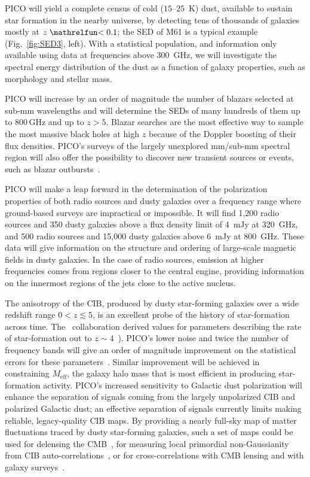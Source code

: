 \documentclass[PICOReport.tex]{subfiles}
\begin{document}
PICO will yield a complete census of cold ($15$--$25$~K) dust, available to sustain star formation in the nearby universe, by detecting tens of thousands of galaxies mostly at $z\simlt 0.1$; the \ac{SED} of M61 is a typical example (Fig.~\ref{fig:SED3}, left). With a statistical population, and information only available using data at frequencies above 300~GHz, we will investigate the spectral energy distribution of the dust as a function of galaxy properties, such as morphology and stellar mass. 

PICO will increase by an order of magnitude the number of blazars selected at sub-mm wavelengths and will determine the SEDs of many hundreds of them up to 800\,GHz and up to $z> 5$. Blazar searches are the most effective way to sample the most massive black holes at high $z$ because of the Doppler boosting of their flux densities. PICO's surveys of the largely unexplored mm/sub-mm spectral region will also offer the possibility to discover new transient sources or events, such as blazar outbursts~\cite{Metzger2015}.

PICO will make a leap forward in the determination of the polarization properties of both radio sources and dusty galaxies over a frequency range where ground-based surveys are impractical or impossible.
It will find  1,200 radio sources and 350 dusty galaxies above a flux density limit of 4~mJy at 320~GHz, and 500 radio sources and 15,000 dusty galaxies above 6~mJy at 800~GHz.
These data will give information on the structure and ordering of large-scale magnetic fields in  dusty galaxies. In the case of radio sources, emission at higher frequencies comes from regions closer to the central engine, providing information on the innermost regions of the jets close to the active nucleus. 

The anisotropy of the \ac{CIB}, produced by dusty star-forming galaxies over a wide redshift range $0 < z \lesssim 5$, is an excellent probe of the history of star-formation across time. The \planck\ collaboration derived values for parameters describing the rate of star-formation out to $z\sim4$~\cite{2014A&A...571A..30P,2014A&A...571A..18P,madau2014}). PICO's lower noise and twice the number of frequency bands will give an order of magnitude improvement on the statistical errors for these parameters~\cite{Wu:2016hej}. Similar improvement will be achieved in constraining $M_{\mathrm{eff}}$, the galaxy halo mass that is most efficient in producing star-formation activity. PICO's increased sensitivity to Galactic dust polarization will enhance the separation of signals coming from the largely unpolarized \ac{CIB} and polarized Galactic dust; an effective separation of signals currently limits making reliable, legacy-quality \ac{CIB} maps. 
By providing a nearly full-sky map of matter fluctuations traced by dusty star-forming galaxies, such a set of maps could be used for delensing the CMB~\cite{Sherwin/Schmittfull}, for measuring local primordial non-Gaussianity from \ac{CIB} auto-correlations~\cite{tucci}, or for cross-correlations with CMB lensing and with galaxy surveys~\cite{Schmittfull/Seljak}.
\end{document}
